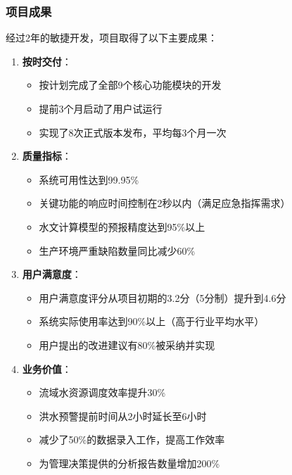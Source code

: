 \subsubsection{项目成果}\label{ux9879ux76eeux6210ux679c}

经过2年的敏捷开发，项目取得了以下主要成果：

\begin{enumerate}
\def\labelenumi{\arabic{enumi}.}
\tightlist
\item
  \textbf{按时交付}：

  \begin{itemize}
  \tightlist
  \item
    按计划完成了全部9个核心功能模块的开发
  \item
    提前3个月启动了用户试运行
  \item
    实现了8次正式版本发布，平均每3个月一次
  \end{itemize}
\item
  \textbf{质量指标}：

  \begin{itemize}
  \tightlist
  \item
    系统可用性达到99.95\%
  \item
    关键功能的响应时间控制在2秒以内（满足应急指挥需求）
  \item
    水文计算模型的预报精度达到95\%以上
  \item
    生产环境严重缺陷数量同比减少60\%
  \end{itemize}
\item
  \textbf{用户满意度}：

  \begin{itemize}
  \tightlist
  \item
    用户满意度评分从项目初期的3.2分（5分制）提升到4.6分
  \item
    系统实际使用率达到90\%以上（高于行业平均水平）
  \item
    用户提出的改进建议有80\%被采纳并实现
  \end{itemize}
\item
  \textbf{业务价值}：

  \begin{itemize}
  \tightlist
  \item
    流域水资源调度效率提升30\%
  \item
    洪水预警提前时间从2小时延长至6小时
  \item
    减少了50\%的数据录入工作，提高工作效率
  \item
    为管理决策提供的分析报告数量增加200\%
  \end{itemize}
\end{enumerate}

